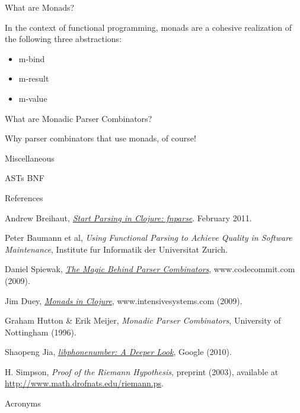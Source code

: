 \documentclass[presentation]{beamer}
\begin{document}
\begin{frame}{What are Monads?}

  In the context of functional programming, monads are a cohesive
  realization of the following three abstractions:

  \begin{itemize}

\item m-bind
\item m-result
\item m-value
\end{itemize}

\end{frame}

\begin{frame}{What are Monadic Parser Combinators?}

Why parser combinators that use monads, of course!

\end{frame}

\begin{frame}{Miscellaneous}

  \ac{AST}s
  \ac{BNF}

\end{frame}

\begin{frame}{References}

\begin{thebibliography}{9}

 Andrew Breihaut,
\href{http://brehaut.net/blog/2011/fnparse_introduction}{\emph{Start
    Parsing in Clojure: fnparse}}. February 2011.

 Peter Baumann et al,
\emph{Using Functional Parsing to Achieve Quality in Software
  Maintenance},
Institute fur Informatik der Universitat Zurich.

 Daniel Spiewak,
\href{http://www.codecommit.com/blog/scala/the-magic-behind-parser-combinators}{\emph{The
Magic Behind Parser Combinators}}, www.codecommit.com (2009).

 Jim Duey,
\href{http://www.intensivesystems.net/tutorials/monads_101.html}{\emph{Monads in Clojure}},
www.intensivesystems.com (2009).

 Graham Hutton \& Erik Meijer, \emph{Monadic Parser Combinators}, University
of Nottingham (1996).

 Shaopeng Jia,
\href{https://docs.google.com/present/view?id=0Ae6JSEqM3Qz6ZDk0bmd3d18yODRmejZ2N21kdw}{\emph{libphonenumber:
    A Deeper Look}}, Google (2010).

 H. Simpson, \emph{Proof of the Riemann
Hypothesis},  preprint (2003), available at
\url{http://www.math.drofnats.edu/riemann.ps}.

\end{thebibliography}

\end{frame}

\begin{frame}{Acronyms}
  \begin{acronym}[BNF]
  \end{acronym}
\end{frame}
\end{document}
